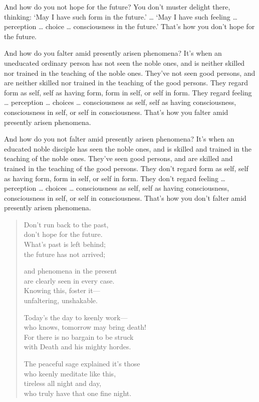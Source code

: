 \documentclass[12pt,openany]{book}%
\begin{document}
And how do you not hope for the future? You don’t muster delight there, thinking: ‘May I have such form in the future.’ … ‘May I have such feeling … perception … choice … consciousness in the future.’ That’s how you don’t hope for the future. 

And how do you falter amid presently arisen phenomena? It’s when an uneducated ordinary person has not seen the noble ones, and is neither skilled nor trained in the teaching of the noble ones. They’ve not seen good persons, and are neither skilled nor trained in the teaching of the good persons. They regard form as self, self as having form, form in self, or self in form. They regard feeling … perception … choices … consciousness as self, self as having consciousness, consciousness in self, or self in consciousness. That’s how you falter amid presently arisen phenomena. 

And how do you not falter amid presently arisen phenomena? It’s when an educated noble disciple has seen the noble ones, and is skilled and trained in the teaching of the noble ones. They’ve seen good persons, and are skilled and trained in the teaching of the good persons. They don’t regard form as self, self as having form, form in self, or self in form. They don’t regard feeling … perception … choices … consciousness as self, self as having consciousness, consciousness in self, or self in consciousness. That’s how you don’t falter amid presently arisen phenomena. 

\begin{verse}%
Don’t run back to the past, \\
don’t hope for the future. \\
What’s past is left behind; \\
the future has not arrived; 

and phenomena in the present \\
are clearly seen in every case. \\
Knowing this, foster it—\\
unfaltering, unshakable. 

Today’s the day to keenly work—\\
who knows, tomorrow may bring death! \\
For there is no bargain to be struck \\
with Death and his mighty hordes. 

The peaceful sage explained it’s those \\
who keenly meditate like this, \\
tireless all night and day, \\
who truly have that one fine night. 

%
\end{verse}
\end{document}

